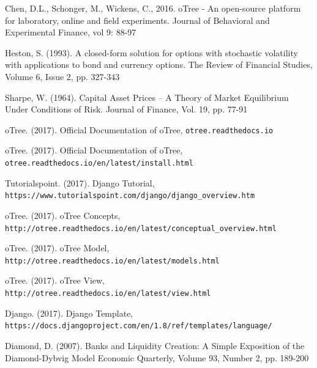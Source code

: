 



\begin{thebibliography}{XX}
	
 Chen, D.L., Schonger, M., Wickens, C., 2016. oTree - An open-source platform for laboratory, online and field experiments. Journal of Behavioral and Experimental Finance, vol 9: 88-97

 Heston, S. (1993). A closed-form solution for options with stochastic volatility with applications to bond and currency options.
The Review of Financial Studies, Volume 6, Issue 2, pp. 327-343

 Sharpe, W. (1964). Capital Asset Prices -- A Theory of Market Equilibrium Under Conditions of Risk. Journal of Finance, Vol. 19, pp. 77-91

 oTree. (2017). Official Documentation of oTree, \verb|otree.readthedocs.io|

 oTree. (2017). Official Documentation of oTree,\\ \verb|otree.readthedocs.io/en/latest/install.html|

 Tutorialspoint. (2017). Django Tutorial,\\ \verb|https://www.tutorialspoint.com/django/django_overview.htm|

 oTree. (2017). oTree Concepts,\\ \verb|http://otree.readthedocs.io/en/latest/conceptual_overview.html|

 oTree. (2017). oTree Model,\\ \verb|http://otree.readthedocs.io/en/latest/models.html|

 oTree. (2017). oTree View,\\ \verb|http://otree.readthedocs.io/en/latest/view.html|

 Django. (2017). Django Template,\\ \verb|https://docs.djangoproject.com/en/1.8/ref/templates/language/|

 Diamond, D. (2007). Banks and Liquidity Creation: A Simple Exposition of the Diamond-Dybvig Model 
Economic Quarterly, Volume 93, Number 2, pp. 189-200


\end{thebibliography}

